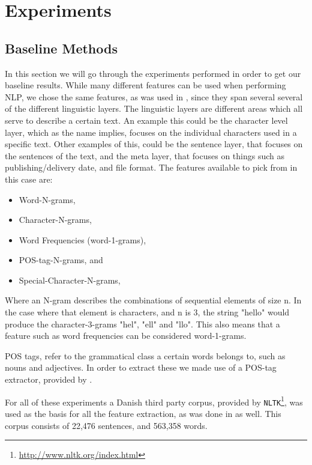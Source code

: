 \section{Experiments} \label{sec:experiments}


\subsection{Baseline Methods} \label{subsec:baseline}

In this section we will go through the experiments performed in order to get
our baseline results. While many different features can be used when performing
\gls{NLP}, we chose the same features, as was used in \cite{US}, since they
span several several of the different linguistic layers. The linguistic layers
are different areas which all serve to describe a certain text. An example this
could be the character level layer, which as the name implies, focuses on the
individual characters used in a specific text. Other examples of this, could
be the sentence layer, that focuses on the sentences of the text, and the meta
layer, that focuses on things such as publishing/delivery date, and file format.
The features available to pick from in this case are:

\begin{itemize}
    \item Word-N-grams,
    \item Character-N-grams,
    \item Word Frequencies (word-1-grams),
    \item \gls{POS}-tag-N-grams, and
    \item Special-Character-N-grams,
\end{itemize}

Where an N-gram describes the combinations of sequential elements of size n. In
the case where that element is characters, and n is 3, the string "hello" would
produce the character-3-grams "hel", "ell" and "llo". This also means that a
feature such as word frequencies can be considered word-1-grams.

\gls{POS} tags, refer to the grammatical class a certain words belongs to, such
as nouns and adjectives. In order to extract these we made use of a POS-tag
extractor, provided by \cite{polyglot}.

For all of these experiments a Danish third party corpus, provided by
\texttt{NLTK}\footnote{\url{http://www.nltk.org/index.html}}, was used as the
basis for all the feature extraction, as was done in \cite{US} as well. This
corpus consists of 22,476 sentences, and 563,358 words.

